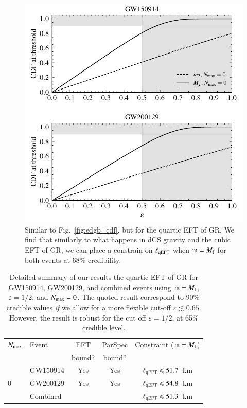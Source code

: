 \documentclass[twocolumn,
               prd,
               aps,
               superscriptaddress,
               tightenlines,
               nofootinbib,
               eqsecnum,
               amsfonts,
               amsmath,
               longbibliography]{revtex4-1}
\newcommand{\gm}{\mathfrak{m}}
\begin{document}
\begin{figure}[t]
\includegraphics[width=\columnwidth]{figs/qeft_cdf_varying_threshold_corrected.pdf}
\caption{Similar to Fig.~\ref{fig:edgb_cdf}, but for the quartic EFT of GR.
We find that similarly to what happens in dCS gravity and the cubic EFT of GR, we
can place a constrain on $\ell_{\rm qEFT}$ when $\gm = M_{\rm f}$ for both events at 68\% credibility.
}
\label{fig:qEFT_cdf}
\end{figure}

\begin{table}[h]
\begin{tabular}{l l c c c}
\hline
\hline
$N_{\rm max}$ & Event & EFT    & ParSpec & Constraint ($\gm = M_{\rm f}$) \\
              &       & bound? & bound?  &                            \\
\hline
  & GW150914 & Yes & Yes  & $\ell_{\rm qEFT} \leqslant 51.7$~km \\
0 & GW200129 & Yes & Yes  & $\ell_{\rm qEFT} \leqslant 54.8$~km \\
  & Combined &     &      & \cellcolor{black!10}$\ell_{\rm qEFT} \leqslant 51.3$~km \\
\hline
\hline
\end{tabular}
\caption{Detailed summary of our results the quartic EFT of GR for GW150914, GW200129, and
combined events using $\gm = M_{\rm f}$, $\varepsilon = 1/2$, and $N_{\rm max} = 0$. The quoted
result correspond to 90\% credible values \emph{if} we allow for a more flexible cut-off $\varepsilon \lesssim 0.65$.
However, the result is robust for the cut off $\varepsilon = 1/2$, at 65\% credible level.
}
\label{tab:summary_qeft}
\end{table}
\end{document}
